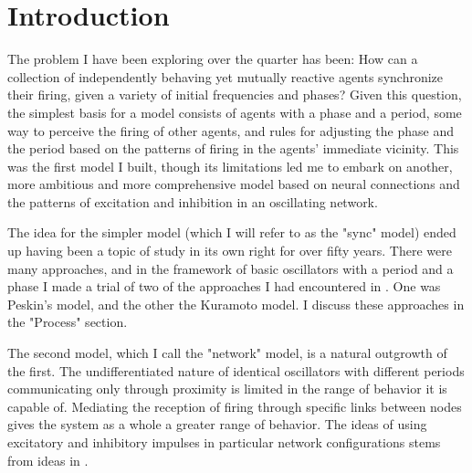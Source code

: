 \documentclass[12pt]{article}
\begin{document}
\maketitle

\section{Introduction}

The problem I have been exploring over the quarter has been:  How can a collection of independently behaving yet mutually reactive agents synchronize their firing, given a variety of initial frequencies and phases?  Given this question, the simplest basis for a model consists of agents with a phase and a period, some way to perceive the firing of other agents, and rules for adjusting the phase and the period based on the patterns of firing in the agents' immediate vicinity.  This was the first model I built, though its limitations led me to embark on another, more ambitious and more comprehensive model based on neural connections and the patterns of excitation and inhibition in an oscillating network.

The idea for the simpler model (which I will refer to as the "sync" model) ended up having been a topic of study in its own right for over fifty years.  There were many approaches, and in the framework of basic oscillators with a period and a phase I made a trial of two of the approaches I had encountered in \cite{Strogatz}.  One was Peskin's model, and the other the Kuramoto model.  I discuss these approaches in the "Process" section.

The second model, which I call the "network" model, is a natural outgrowth of the first.  The undifferentiated nature of identical oscillators with different periods communicating only through proximity is limited in the range of behavior it is capable of.  Mediating the reception of firing through specific links between nodes gives the system as a whole a greater range of behavior.  The ideas of using excitatory and inhibitory impulses in particular network configurations stems from ideas in \cite{Buzsaki}.
\end{document}
